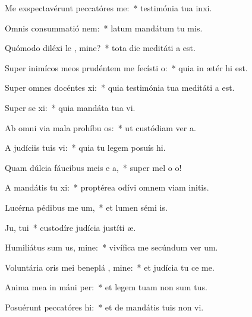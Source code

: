 \item Me exspectavérunt peccatóres   me:~* testimónia tua inxi.
\item Omnis consummatió  nem:~* latum mandátum tu mis.
\item Quómodo diléxi le , mine?~* tota die meditáti a est.
\item Super inimícos meos prudéntem me fecísti  o:~* quia in ætér hi est.
\item Super omnes docéntes  xi:~* quia testimónia tua meditáti a est.
\item Super se xi:~* quia mandáta tua vi.
\item Ab omni via mala prohíbu  os:~* ut custódiam ver a.
\item A judíciis tuis  vi:~* quia tu legem posuís hi.
\item Quam dúlcia fáucibus meis e a,~* super mel o o!
\item A mandátis tu xi:~* proptérea odívi omnem viam initis.
\item Lucérna pédibus me  um,~* et lumen sémi is.
\item Ju,  tui~* custodíre judícia justíti æ.
\item Humiliátus sum us, mine:~* vivífica me secúndum ver um.
\item Voluntária oris mei beneplá , mine:~* et judícia tu ce me.
\item Anima mea in máni  per:~* et legem tuam non sum tus.
\item Posuérunt peccatóres  hi:~* et de mandátis tuis non vi.
